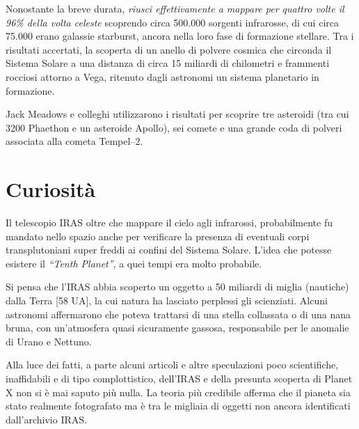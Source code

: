 \documentclass[12pt,a4paper]{article}
\begin{document}
Nonostante la breve durata, \emph{riusci effettivamente a mappare per quattro volte il 96\% della volta celeste} scoprendo circa 500.000 sorgenti infrarosse, di cui circa 75.000 erano galassie starburst, ancora nella loro fase di formazione stellare. Tra i risultati accertati, la scoperta di un anello di polvere cosmica che circonda il Sistema Solare a una distanza di circa 15 miliardi di chilometri e frammenti rocciosi attorno a Vega, ritenuto dagli astronomi un sistema planetario in formazione.

Jack Meadows e colleghi utilizzarono i risultati per scoprire tre asteroidi (tra cui 3200 Phaethon e un asteroide Apollo), sei comete e una grande coda di polveri associata alla cometa Tempel--2.

\section*{Curiosità}
\label{curiosit}

Il telescopio IRAS oltre che mappare il cielo agli infrarossi, probabilmente fu mandato nello spazio anche per verificare la presenza di eventuali corpi transplutoniani super freddi ai confini del Sistema Solare. L'idea che potesse esistere il \emph{``Tenth Planet''}, a quei tempi era molto probabile.

Si pensa che l'IRAS abbia scoperto un oggetto a 50 miliardi di miglia (nautiche) dalla Terra [58 UA], la cui natura ha lasciato perplessi gli scienziati. Alcuni astronomi affermarono che poteva trattarsi di una stella collassata o di una nana bruna, con un'atmosfera quasi sicuramente gassosa, responsabile per le anomalie di Urano e Nettuno.

Alla luce dei fatti, a parte alcuni articoli e altre speculazioni poco scientifiche, inaffidabili e di tipo complottistico, dell'IRAS e della presunta scoperta di Planet X non si è mai saputo più nulla. La teoria più credibile afferma che il pianeta sia stato realmente fotografato ma è tra le migliaia di oggetti non ancora identificati dall'archivio IRAS.
\end{document}

